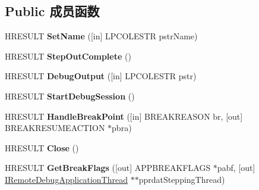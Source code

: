\subsection*{Public 成员函数}
\begin{DoxyCompactItemize}
\item 
\mbox{\label{interface_i_debug_application64_a63b34d2746265f5effdc3a2049846f65}} 
H\+R\+E\+S\+U\+LT {\bfseries Set\+Name} (\mbox{[}in\mbox{]} L\+P\+C\+O\+L\+E\+S\+TR pstr\+Name)
\item 
\mbox{\label{interface_i_debug_application64_a5b0f0dea2e3187b5329fc8462973b06f}} 
H\+R\+E\+S\+U\+LT {\bfseries Step\+Out\+Complete} ()
\item 
\mbox{\label{interface_i_debug_application64_a233f28d645eab73c74d22c12dced89ca}} 
H\+R\+E\+S\+U\+LT {\bfseries Debug\+Output} (\mbox{[}in\mbox{]} L\+P\+C\+O\+L\+E\+S\+TR pstr)
\item 
\mbox{\label{interface_i_debug_application64_aae92b022d46d80ef1107be83e750b654}} 
H\+R\+E\+S\+U\+LT {\bfseries Start\+Debug\+Session} ()
\item 
\mbox{\label{interface_i_debug_application64_ad6a9ae31d37dd423acd82138e78aae6d}} 
H\+R\+E\+S\+U\+LT {\bfseries Handle\+Break\+Point} (\mbox{[}in\mbox{]} B\+R\+E\+A\+K\+R\+E\+A\+S\+ON br, \mbox{[}out\mbox{]} B\+R\+E\+A\+K\+R\+E\+S\+U\+M\+E\+A\+C\+T\+I\+ON $\ast$pbra)
\item 
\mbox{\label{interface_i_debug_application64_a48ff2ddb77e9a3abda5f9447536330a8}} 
H\+R\+E\+S\+U\+LT {\bfseries Close} ()
\item 
\mbox{\label{interface_i_debug_application64_a3b8357726be861502132bafb153e6022}} 
H\+R\+E\+S\+U\+LT {\bfseries Get\+Break\+Flags} (\mbox{[}out\mbox{]} A\+P\+P\+B\+R\+E\+A\+K\+F\+L\+A\+GS $\ast$pabf, \mbox{[}out\mbox{]} \hyperlink{interface_i_remote_debug_application_thread}{I\+Remote\+Debug\+Application\+Thread} $\ast$$\ast$pprdat\+Stepping\+Thread)
\item 
\mbox{\label{interface_i_debug_application64_a2d4bcf5ad7278cfa288f57233a1fd31f}} 
$$
\end{DoxyCompactItemize}
